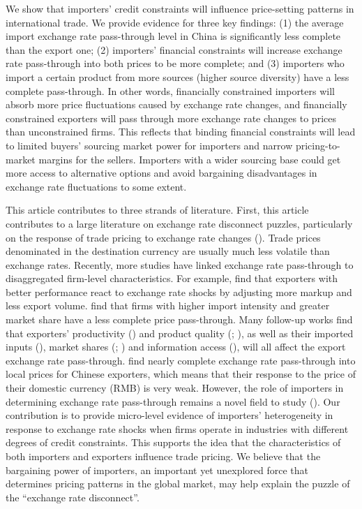 We show that importers' credit constraints will influence price-setting patterns in international trade. We provide evidence for three key findings: (1) the average import exchange rate pass-through level in China is significantly less complete than the export one; (2) importers' financial constraints will increase exchange rate pass-through into both prices to be more complete; and (3) importers who import a certain product from more sources (higher source diversity) have a less complete pass-through. In other words, financially constrained importers will absorb more price fluctuations caused by exchange rate changes, and financially constrained exporters will pass through more exchange rate changes to prices than unconstrained firms. This reflects that binding financial constraints will lead to limited buyers' sourcing market power for importers and narrow pricing-to-market margins for the sellers. Importers with a wider sourcing base could get more access to alternative options and avoid bargaining disadvantages in exchange rate fluctuations to some extent.

This article contributes to three strands of literature. First, this article contributes to a large literature on exchange rate disconnect puzzles, particularly on the response of trade pricing to exchange rate changes (\cite{campa2005}). Trade prices denominated in the destination currency are usually much less volatile than exchange rates. Recently, more studies have linked exchange rate pass-through to disaggregated firm-level characteristics. For example, \cite{bmm2012} find that exporters with better performance react to exchange rate shocks by adjusting more markup and less export volume. \cite{aik2014} find that firms with higher import intensity and greater market share have a less complete price pass-through. Many follow-up works find that exporters' productivity (\cite{lmx2015}) and product quality (\cite{chen2016}; \cite{auer2018}), as well as their imported inputs (\cite{wang-yu2021}), market shares (\cite{auer2016}; \cite{devereux2017}) and information access (\cite{garetto2016}), will all affect the export exchange rate pass-through. \cite{lmx2015} find nearly complete exchange rate pass-through into local prices for Chinese exporters, which means that their response to the price of their domestic currency (RMB) is very weak. However, the role of importers in determining exchange rate pass-through remains a novel field to study (\cite{alviarez2023}). Our contribution is to provide micro-level evidence of importers' heterogeneity in response to exchange rate shocks when firms operate in industries with different degrees of credit constraints. This supports the idea that the characteristics of both importers and exporters influence trade pricing. We believe that the bargaining power of importers, an important yet unexplored force that determines pricing patterns in the global market, may help explain the puzzle of the ``exchange rate disconnect''. 

